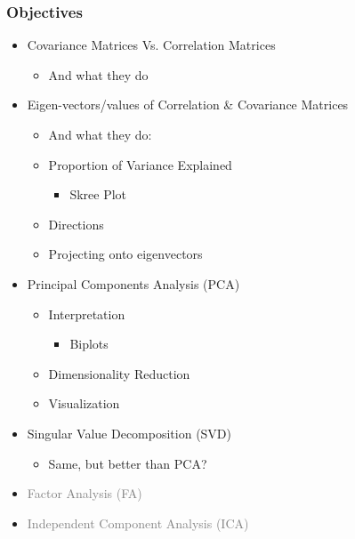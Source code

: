 \documentclass[xcolor={dvipsnames}]{beamer}
\begin{document}
\frame
{
\frametitle{Objectives}

\begin{itemize}
\item Covariance Matrices Vs. Correlation Matrices 
\begin{itemize}
\item And what they do
\end{itemize}
\item Eigen-vectors/values of Correlation \& Covariance Matrices
\begin{itemize}
\item And what they do:
\item Proportion of Variance Explained
\begin{itemize}
\item Skree Plot
\end{itemize}
\item Directions
\item Projecting onto eigenvectors
\end{itemize}
\item Principal Components Analysis (PCA)
\begin{itemize}
\item Interpretation
\begin{itemize}
\item Biplots
\end{itemize}
\item Dimensionality Reduction
\item Visualization
\end{itemize}
\item Singular Value Decomposition (SVD)
\begin{itemize}
\item Same, but better than PCA?
\end{itemize}
\item \textcolor{gray}{Factor Analysis (FA)}
\item \textcolor{gray}{Independent Component Analysis (ICA)}
\end{itemize}
}
\end{document}
